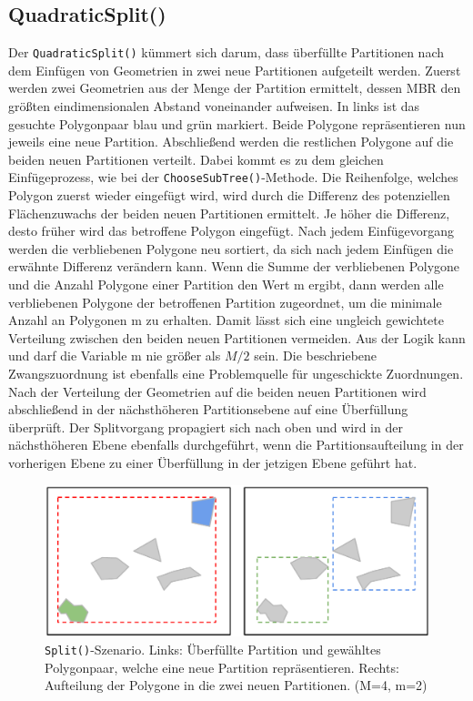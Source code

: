 \documentclass[runningheads,a4paper]{llncs}
\begin{document}
	\subsection{QuadraticSplit()}
	\label{sec:r-split}
	Der \texttt{QuadraticSplit()} kümmert sich darum, dass überfüllte Partitionen nach dem Einfügen von Geometrien in zwei neue Partitionen aufgeteilt werden. Zuerst werden zwei Geometrien aus der Menge der Partition ermittelt, dessen \acs{MBR} den größten eindimensionalen Abstand voneinander aufweisen. In  links ist das gesuchte Polygonpaar blau und grün markiert. Beide Polygone repräsentieren nun jeweils eine neue Partition. Abschließend werden die restlichen Polygone auf die beiden neuen Partitionen verteilt. Dabei kommt es zu dem gleichen Einfügeprozess, wie bei der \texttt{ChooseSubTree()}-Methode. Die Reihenfolge, welches Polygon zuerst wieder eingefügt wird, wird durch die Differenz des potenziellen Flächenzuwachs der beiden neuen Partitionen ermittelt. Je höher die Differenz, desto früher wird das betroffene Polygon eingefügt.
	Nach jedem Einfügevorgang werden die verbliebenen Polygone neu sortiert, da sich nach jedem Einfügen die erwähnte Differenz verändern kann. Wenn die Summe der verbliebenen Polygone und die Anzahl Polygone einer Partition den Wert \acs{m} ergibt, dann werden alle verbliebenen Polygone der betroffenen Partition zugeordnet, um die minimale Anzahl an Polygonen \acs{m} zu erhalten. Damit lässt sich eine ungleich gewichtete Verteilung zwischen den beiden neuen Partitionen vermeiden. Aus der Logik kann und darf die Variable \acs{m} nie größer als $M/2$ sein.
	Die beschriebene Zwangszuordnung ist ebenfalls eine Problemquelle für ungeschickte Zuordnungen. Nach der Verteilung der Geometrien auf die beiden neuen Partitionen wird abschließend in der nächsthöheren Partitionsebene auf eine Überfüllung überprüft. Der Splitvorgang propagiert sich nach oben und wird in der nächsthöheren Ebene ebenfalls durchgeführt, wenn die Partitionsaufteilung in der vorherigen Ebene zu einer Überfüllung in der jetzigen Ebene geführt hat.
	\begin{figure}[H]
		\begin{center}
		\includegraphics[width=1.0\textwidth ]{003_Beispiel_Quadratic_Split_1.pdf}
		\caption{\texttt{Split()}-Szenario. Links: Überfüllte Partition und gewähltes Polygonpaar, welche eine neue Partition repräsentieren. Rechts: Aufteilung der Polygone in die zwei neuen Partitionen. (\acs{M}=4, \acs{m}=2)}
		\label{fig:beispiel-quadratic-split}
		\end{center}
	\end{figure}
\end{document}
